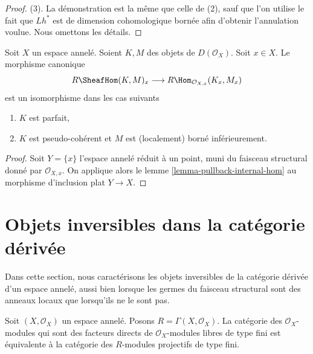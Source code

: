 {\begin{proof}
(3). La démonstration est la même que celle de (2), sauf que l'on utilise le fait que $Lh^*$ est de dimension cohomologique bornée afin d'obtenir l'annulation voulue. Nous omettons les détails.

\end{proof}

\begin{lemma}

\label{lemma-stalk-internal-hom}
Soit $X$ un espace annelé. Soient $K, M$ des objets de $D(\mathcal{O}_X)$. Soit $x \in X$. Le morphisme canonique $$
R\SheafHom(K, M)_x \longrightarrow
R\Hom_{\mathcal{O}_{X, x}}(K_x, M_x)
$$ est un isomorphisme dans les cas suivants
\begin{enumerate}
\item $K$ est parfait,
\item $K$ est pseudo-cohérent et $M$ est (localement) borné inférieurement.
\end{enumerate}

\end{lemma}

\begin{proof}
Soit $Y = \{x\}$ l'espace annelé réduit à un point, muni du faisceau structural donné par $\mathcal{O}_{X, x}$. On applique alors le lemme \ref{lemma-pullback-internal-hom} au morphisme d'inclusion plat $Y \to X$.
\end{proof}







\section{Objets inversibles dans la catégorie dérivée}
\label{section-invertible-D-or-R}

\noindent
Dans cette section, nous caractérisons les objets inversibles de la catégorie dérivée d'un espace annelé, aussi bien lorsque les germes du faisceau structural sont des anneaux locaux que lorsqu'ils ne le sont pas.

\begin{lemma}

\label{lemma-category-summands-finite-free}
Soit $(X, \mathcal{O}_X)$ un espace annelé. Posons $R = \Gamma(X, \mathcal{O}_X)$. La catégorie des $\mathcal{O}_X$-modules qui sont des facteurs directs de $\mathcal{O}_X$-modules libres de type fini est équivalente à la catégorie des $R$-modules projectifs de type fini.
\end{lemma}

}
